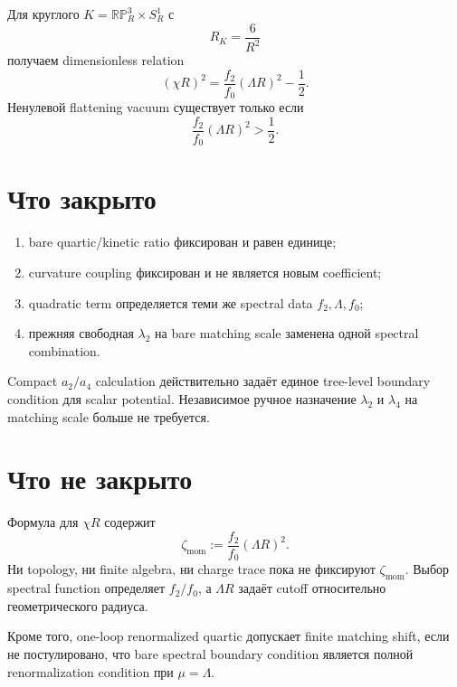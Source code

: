 Для круглого
\(K=\mathbb{RP}^3_R\times S^1_R\) с
\begin{equation}
 R_K=\frac6{R^2}
\end{equation}
получаем dimensionless relation
\begin{equation}
 \boxed{
 (\chi R)^2
 =
 \frac{f_2}{f_0}(\Lambda R)^2
 -\frac12.}
\end{equation}
Ненулевой flattening vacuum существует только если
\begin{equation}
 \frac{f_2}{f_0}(\Lambda R)^2>\frac12.
\end{equation}

\section{Что закрыто}

\begin{enumerate}
 \item bare quartic/kinetic ratio фиксирован и равен единице;
 \item curvature coupling фиксирован и не является новым coefficient;
 \item quadratic term определяется теми же spectral data
 \(f_2,\Lambda,f_0\);
 \item прежняя свободная \(\lambda_2\) на bare matching scale заменена
 одной spectral combination.
\end{enumerate}

\begin{proposition}
Compact \(a_2/a_4\) calculation действительно задаёт единое tree-level
boundary condition для scalar potential. Независимое ручное назначение
\(\lambda_2\) и \(\lambda_4\) на matching scale больше не требуется.
\end{proposition}

\section{Что не закрыто}

Формула для \(\chi R\) содержит
\begin{equation}
 \zeta_{\mathrm{mom}}
 :=
 \frac{f_2}{f_0}(\Lambda R)^2.
\end{equation}
Ни topology, ни finite algebra, ни charge trace пока не фиксируют
\(\zeta_{\mathrm{mom}}\). Выбор spectral function определяет
\(f_2/f_0\), а \(\Lambda R\) задаёт cutoff относительно геометрического
радиуса.

Кроме того, one-loop renormalized quartic допускает finite matching shift,
если не постулировано, что bare spectral boundary condition является
полной renormalization condition при \(\mu=\Lambda\).

